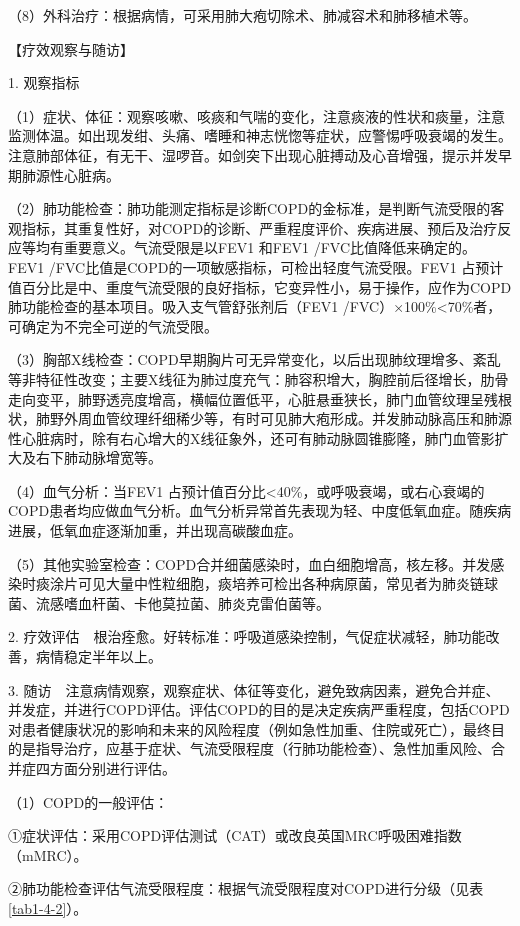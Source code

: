 （8）外科治疗：根据病情，可采用肺大疱切除术、肺减容术和肺移植术等。

【疗效观察与随访】

1. 观察指标

（1）症状、体征：观察咳嗽、咳痰和气喘的变化，注意痰液的性状和痰量，注意监测体温。如出现发绀、头痛、嗜睡和神志恍惚等症状，应警惕呼吸衰竭的发生。注意肺部体征，有无干、湿啰音。如剑突下出现心脏搏动及心音增强，提示并发早期肺源性心脏病。

（2）肺功能检查：肺功能测定指标是诊断COPD的金标准，是判断气流受限的客观指标，其重复性好，对COPD的诊断、严重程度评价、疾病进展、预后及治疗反应等均有重要意义。气流受限是以FEV{1}
和FEV{1} /FVC比值降低来确定的。FEV{1}
/FVC比值是COPD的一项敏感指标，可检出轻度气流受限。FEV{1}
占预计值百分比是中、重度气流受限的良好指标，它变异性小，易于操作，应作为COPD肺功能检查的基本项目。吸入支气管舒张剂后（FEV{1}
/FVC）×100\%\textless{}70\%者，可确定为不完全可逆的气流受限。

（3）胸部X线检查：COPD早期胸片可无异常变化，以后出现肺纹理增多、紊乱等非特征性改变；主要X线征为肺过度充气：肺容积增大，胸腔前后径增长，肋骨走向变平，肺野透亮度增高，横幅位置低平，心脏悬垂狭长，肺门血管纹理呈残根状，肺野外周血管纹理纤细稀少等，有时可见肺大疱形成。并发肺动脉高压和肺源性心脏病时，除有右心增大的X线征象外，还可有肺动脉圆锥膨隆，肺门血管影扩大及右下肺动脉增宽等。

（4）血气分析：当FEV{1}
占预计值百分比\textless{}40\%，或呼吸衰竭，或右心衰竭的COPD患者均应做血气分析。血气分析异常首先表现为轻、中度低氧血症。随疾病进展，低氧血症逐渐加重，并出现高碳酸血症。

（5）其他实验室检查：COPD合并细菌感染时，血白细胞增高，核左移。并发感染时痰涂片可见大量中性粒细胞，痰培养可检出各种病原菌，常见者为肺炎链球菌、流感嗜血杆菌、卡他莫拉菌、肺炎克雷伯菌等。

2.
疗效评估　根治痊愈。好转标准：呼吸道感染控制，气促症状减轻，肺功能改善，病情稳定半年以上。

3.
随访　注意病情观察，观察症状、体征等变化，避免致病因素，避免合并症、并发症，并进行COPD评估。评估COPD的目的是决定疾病严重程度，包括COPD对患者健康状况的影响和未来的风险程度（例如急性加重、住院或死亡），最终目的是指导治疗，应基于症状、气流受限程度（行肺功能检查）、急性加重风险、合并症四方面分别进行评估。

（1）COPD的一般评估：

①症状评估：采用COPD评估测试（CAT）或改良英国MRC呼吸困难指数（mMRC）。

②肺功能检查评估气流受限程度：根据气流受限程度对COPD进行分级（见表\ref{tab1-4-2}）。


